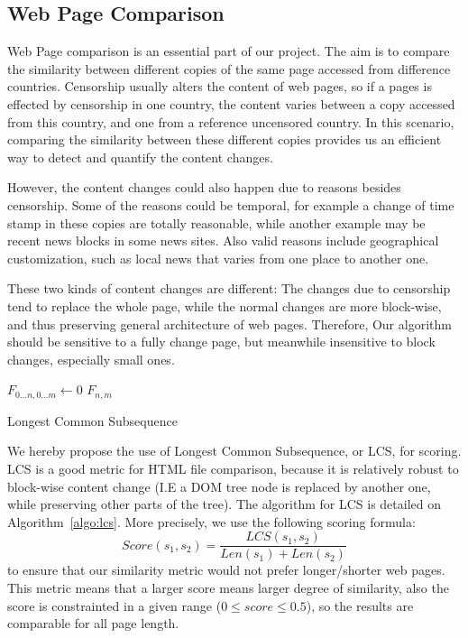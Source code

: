 \documentclass[conference]{IEEEtran}
\begin{document}
\subsection{Web Page Comparison}

Web Page comparison is an essential part of our project.
The aim is to compare the similarity between different copies of the same page accessed from difference countries.
Censorship usually alters the content of web pages, 
so if a pages is effected by censorship in one country,
the content varies between a copy accessed from this country,
and one from a reference uncensored country.
In this scenario, comparing the similarity
between these different copies provides us an efficient
way to detect and quantify the content changes.

However, the content changes could also happen due to reasons
besides censorship.
Some of the reasons could be temporal, 
for example a change of time stamp in these copies are totally reasonable,
while another example may be recent news blocks in some news sites.
Also valid reasons include geographical customization, 
such as local news that varies from one place to another one.

These two kinds of content changes are different:
The changes due to censorship tend to replace the whole page,
while the normal changes are more block-wise, and thus 
preserving general architecture of web pages.
Therefore, Our algorithm should be sensitive to a fully change page,
but meanwhile insensitive to  block changes, especially small ones.

\begin{algorithm}
    \SetAlgoLined
    
    $F_{0\dots n, 0\dots m} \gets 0$\;
    \Return $F_{n,m}$
    
    \caption{Longest Common Subsequence}
    \label{algo:lcs}
\end{algorithm}

We hereby propose the use of Longest Common Subsequence, or LCS, for scoring. LCS is a good metric for HTML file comparison, because it is relatively robust to block-wise content change (I.E a DOM tree node is replaced by another one, while preserving other parts of the tree). 
The algorithm for LCS is detailed on Algorithm~\ref{algo:lcs}.
More precisely, we use the following scoring formula:
\[ Score(s_1,s_2) = \frac{LCS(s_1,s_2)}{Len(s_1)+Len(s_2)} \]
to ensure that our similarity metric would not prefer longer/shorter web pages.
This metric means that a larger score means larger degree of similarity, also the score is constrainted in a given range ($0\leq score \leq 0.5$), so the results are comparable for all page length.
\end{document}
